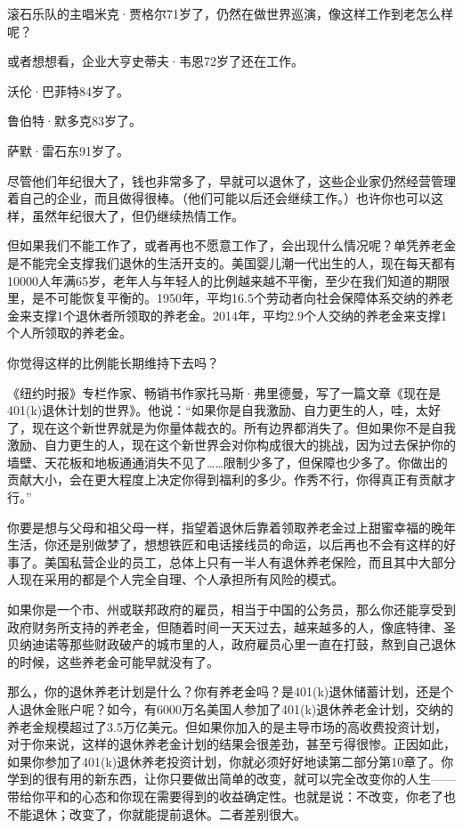 滚石乐队的主唱米克·贾格尔71岁了，仍然在做世界巡演，像这样工作到老怎么样呢？

或者想想看，企业大亨史蒂夫·韦恩72岁了还在工作。

沃伦·巴菲特84岁了。

鲁伯特·默多克83岁了。

萨默·雷石东91岁了。

尽管他们年纪很大了，钱也非常多了，早就可以退休了，这些企业家仍然经营管理着自己的企业，而且做得很棒。（他们可能以后还会继续工作。）也许你也可以这样，虽然年纪很大了，但仍继续热情工作。

但如果我们不能工作了，或者再也不愿意工作了，会出现什么情况呢？单凭养老金是不能完全支撑我们退休的生活开支的。美国婴儿潮一代出生的人，现在每天都有10000人年满65岁，老年人与年轻人的比例越来越不平衡，至少在我们知道的期限里，是不可能恢复平衡的。1950年，平均16.5个劳动者向社会保障体系交纳的养老金来支撑1个退休者所领取的养老金。2014年，平均2.9个人交纳的养老金来支撑1个人所领取的养老金。

你觉得这样的比例能长期维持下去吗？

《纽约时报》专栏作家、畅销书作家托马斯·弗里德曼，写了一篇文章《现在是401(k)退休计划的世界》。他说：“如果你是自我激励、自力更生的人，哇，太好了，现在这个新世界就是为你量体裁衣的。所有边界都消失了。但如果你不是自我激励、自力更生的人，现在这个新世界会对你构成很大的挑战，因为过去保护你的墙壁、天花板和地板通通消失不见了……限制少多了，但保障也少多了。你做出的贡献大小，会在更大程度上决定你得到福利的多少。作秀不行，你得真正有贡献才行。”

你要是想与父母和祖父母一样，指望着退休后靠着领取养老金过上甜蜜幸福的晚年生活，你还是别做梦了，想想铁匠和电话接线员的命运，以后再也不会有这样的好事了。美国私营企业的员工，总体上只有一半人有退休养老保险，而且其中大部分人现在采用的都是个人完全自理、个人承担所有风险的模式。

如果你是一个市、州或联邦政府的雇员，相当于中国的公务员，那么你还能享受到政府财务所支持的养老金，但随着时间一天天过去，越来越多的人，像底特律、圣贝纳迪诺等那些财政破产的城市里的人，政府雇员心里一直在打鼓，熬到自己退休的时候，这些养老金可能早就没有了。

那么，你的退休养老计划是什么？你有养老金吗？是401(k)退休储蓄计划，还是个人退休金账户呢？如今，有6000万名美国人参加了401(k)退休养老金计划，交纳的养老金规模超过了3.5万亿美元。但如果你加入的是主导市场的高收费投资计划，对于你来说，这样的退休养老金计划的结果会很差劲，甚至亏得很惨。正因如此，如果你参加了401(k)退休养老投资计划，你就必须好好地读第二部分第10章了。你学到的很有用的新东西，让你只要做出简单的改变，就可以完全改变你的人生——带给你平和的心态和你现在需要得到的收益确定性。也就是说：不改变，你老了也不能退休；改变了，你就能提前退休。二者差别很大。

